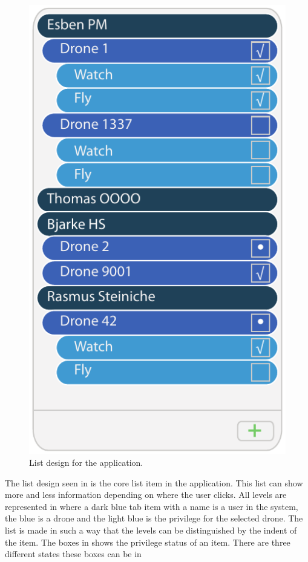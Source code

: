 \begin{figure}[htb]
    \centering
    \includegraphics[scale=1.0]{gfx/list.pdf}
    \caption{List design for the application.}
    \label{fig:list_design}
\end{figure}
The list design seen in  is the core list item in the application. This list can show more and less information depending on where the user clicks. All levels are represented in  where a dark blue tab item with a name is a user in the system, the blue is a drone and the light blue is the privilege for the selected drone.
The list is made in such a way that the levels can be distinguished by the indent of the item.
The boxes in  shows the privilege status of an item. There are three different states these boxes can be in

